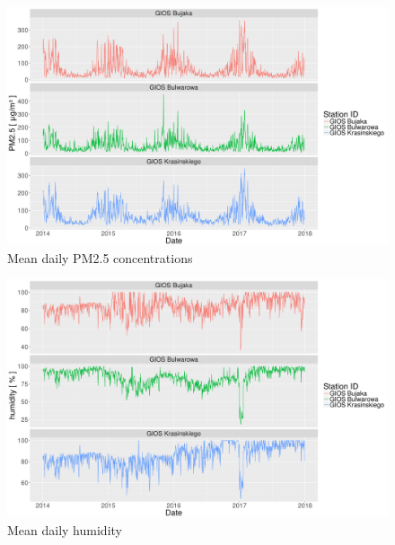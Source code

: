 
\begin{landscape}
\begin{figure}[htp]
\centering
  \centering
  \includegraphics[width=\linewidth]{figures/dataset/trend/pm2_5_yearly_trend.png}
  \caption{Mean daily PM2.5 concentrations}
  \label{fig:dataset-trend-pm25}
\end{figure}
\end{landscape}
\begin{landscape}
\begin{figure}[htp]
\centering
  \centering
  \includegraphics[width=\linewidth]{figures/dataset/trend/humidity_yearly_trend.png}
  \caption{Mean daily humidity}
  \label{fig:dataset-trend-humidity}
\end{figure}
\end{landscape}
